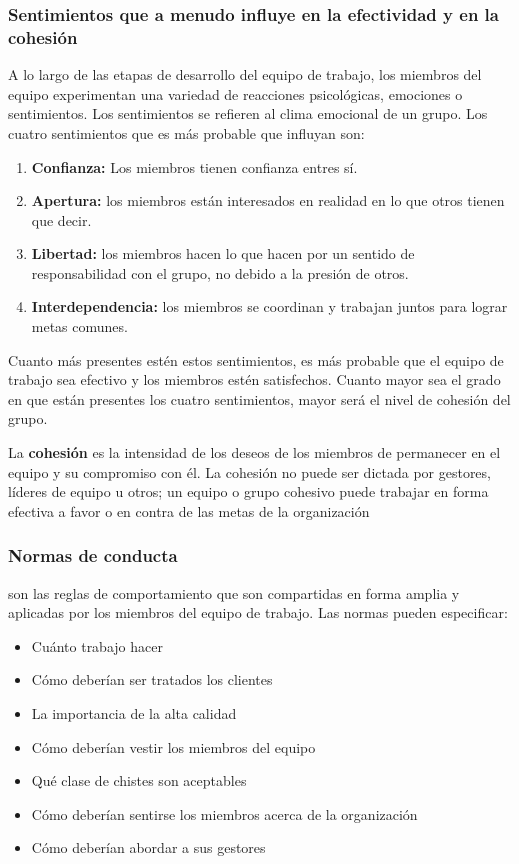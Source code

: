\subsubsection{Sentimientos que a menudo influye 
en la efectividad y en la cohesión}
A lo largo de las etapas de desarrollo del equipo de trabajo, los
miembros del equipo experimentan una variedad de reacciones psicológicas,
emociones o sentimientos. Los sentimientos se refieren al clima emocional
de un grupo. Los cuatro sentimientos que es más probable que influyan son:

\begin{enumerate}
    \item \textbf{Confianza:} Los miembros tienen confianza entres sí.
    \item \textbf{Apertura:} los miembros están interesados en realidad en lo que otros tienen que decir.
    \item \textbf{Libertad:} los miembros hacen lo que hacen por un sentido de responsabilidad con el grupo, no debido a la presión de otros.
    \item \textbf{Interdependencia:} los miembros se coordinan y trabajan juntos para lograr metas comunes.
\end{enumerate}

Cuanto más presentes estén estos sentimientos, es más probable que el
equipo de trabajo sea efectivo y los miembros estén satisfechos.
Cuanto mayor sea el grado en que están presentes los cuatro sentimientos,
mayor será el nivel de cohesión del grupo.

La \textbf{cohesión} es la intensidad de los deseos de los miembros de permanecer
en el equipo y su compromiso con él. La cohesión no puede ser dictada por
gestores, líderes de equipo u otros; un equipo o grupo cohesivo puede
trabajar en forma efectiva a favor o en contra de las metas de la organización

\subsubsection{Normas de conducta}
son las reglas de comportamiento que son compartidas en forma amplia y aplicadas por los miembros del equipo de trabajo. 
Las normas pueden especificar:

\begin{itemize}
    \item Cuánto trabajo hacer
    \item Cómo deberían ser tratados los clientes
    \item La importancia de la alta calidad
    \item Cómo deberían vestir los miembros del equipo
    \item Qué clase de chistes son aceptables
    \item Cómo deberían sentirse los miembros acerca de la organización
    \item Cómo deberían abordar a sus gestores
\end{itemize}

